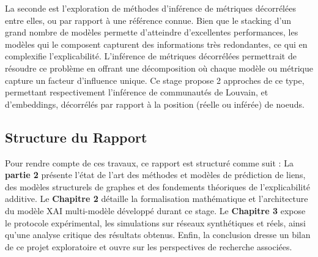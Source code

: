 La seconde est l'exploration de méthodes d'inférence de métriques décorrélées entre elles, ou par rapport à une référence connue. Bien que le stacking d'un grand nombre de modèles permette d'atteindre d'excellentes performances, les modèles qui le composent capturent des informations très redondantes, ce qui en complexifie l'explicabilité. L'inférence de métriques décorrélées permettrait de résoudre ce problème en offrant une décomposition où chaque modèle ou métrique capture un facteur d'influence unique.
Ce stage propose 2 approches de ce type, permettant respectivement l'inférence de communautés de Louvain, et d'embeddings, décorrélés par rapport à la position (réelle ou inférée) de noeuds.

\subsection{Structure du Rapport}
Pour rendre compte de ces travaux, ce rapport est structuré comme suit :
La \textbf{partie 2} présente l'état de l'art des méthodes et modèles de prédiction de liens, des modèles structurels de graphes et des fondements théoriques de l'explicabilité additive.
Le \textbf{Chapitre 2} détaille la formalisation mathématique et l'architecture du modèle XAI multi-modèle développé durant ce stage.
Le \textbf{Chapitre 3} expose le protocole expérimental, les simulations sur réseaux synthétiques et réels, ainsi qu'une analyse critique des résultats obtenus.
Enfin, la conclusion dresse un bilan de ce projet exploratoire et ouvre sur les perspectives de recherche associées.